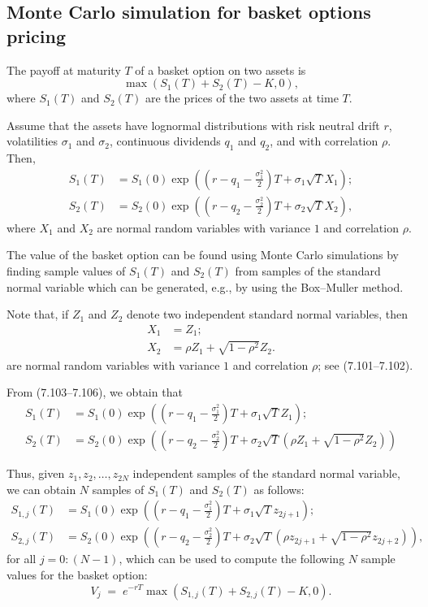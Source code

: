\subsection{Monte Carlo simulation for basket options pricing}

The payoff at maturity $T$ of a basket option on two assets is
\[
\max(S_1(T)+S_2(T)-K,0),
\]
where $S_1(T)$ and $S_2(T)$ are the prices of the two assets at time $T$.

Assume that the assets have lognormal distributions with risk neutral drift $r$, volatilities
$\sigma_1$ and $\sigma_2$, continuous dividends $q_1$ and $q_2$, and with correlation $\rho$.
Then,
\begin{align}
S_1(T) &= S_1(0)\exp\!\left(\left(r-q_1-\frac{\sigma_1^2}{2}\right)T+\sigma_1\sqrt{T}X_1\right); \\
S_2(T) &= S_2(0)\exp\!\left(\left(r-q_2-\frac{\sigma_2^2}{2}\right)T+\sigma_2\sqrt{T}X_2\right),
\end{align}
where $X_1$ and $X_2$ are normal random variables with variance $1$ and correlation $\rho$.

The value of the basket option can be found using Monte Carlo simulations by finding sample
values of $S_1(T)$ and $S_2(T)$ from samples of the standard normal variable which can be
generated, e.g., by using the Box--Muller method.

Note that, if $Z_1$ and $Z_2$ denote two independent standard normal variables, then
\begin{align}
X_1 &= Z_1; \\
X_2 &= \rho Z_1 + \sqrt{1-\rho^2}Z_2.
\end{align}
are normal random variables with variance $1$ and correlation $\rho$; see (7.101--7.102).

From (7.103--7.106), we obtain that
\begin{align}
S_1(T) &= S_1(0)\exp\!\left(\left(r-q_1-\frac{\sigma_1^2}{2}\right)T+\sigma_1\sqrt{T}Z_1\right); \\
S_2(T) &= S_2(0)\exp\!\left(\left(r-q_2-\frac{\sigma_2^2}{2}\right)T+\sigma_2\sqrt{T}\left(\rho Z_1+\sqrt{1-\rho^2}Z_2\right)\right)
\end{align}

Thus, given $z_1, z_2, \ldots, z_{2N}$ independent samples of the standard normal variable, we
can obtain $N$ samples of $S_1(T)$ and $S_2(T)$ as follows:
\begin{align*}
S_{1,j}(T) &= S_1(0)\exp\!\left(\left(r-q_1-\frac{\sigma_1^2}{2}\right)T+\sigma_1\sqrt{T}z_{2j+1}\right); \\
S_{2,j}(T) &= S_2(0)\exp\!\left(\left(r-q_2-\frac{\sigma_2^2}{2}\right)T+\sigma_2\sqrt{T}\left(\rho z_{2j+1}+\sqrt{1-\rho^2}z_{2j+2}\right)\right),
\end{align*}
for all $j = 0:(N-1)$, which can be used to compute the following $N$ sample values for the
basket option:
\[
V_j \;=\; e^{-rT}\max(S_{1,j}(T)+S_{2,j}(T)-K,0).
\]
